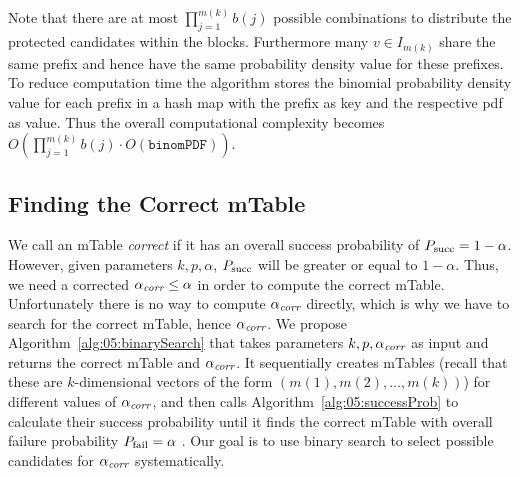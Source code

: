 Note that there are at most $\prod_{j=1}^{m(k)}b(j)$ possible combinations to distribute the protected candidates within the blocks.
%
Furthermore many $v \in I_{m(k)}$ share the same prefix and hence have the same probability density value for these prefixes.
%
To reduce computation time the algorithm stores the binomial probability density value for each prefix in a hash map with the prefix as key and the respective pdf as value.
%
Thus the overall computational complexity becomes $O(\prod_{j=1}^{m(k)}b(j) \cdot O(\texttt{binomPDF}))$.

\subsection{Finding the Correct mTable}\label{subsec:finding-mtable}
We call an mTable \textit{correct} if it has an overall success probability of $P_{\operatorname{succ}} = 1-\alpha$. 
However, given parameters $k,p,\alpha$, $P_{\operatorname{succ}}$ will be greater or equal to $1-\alpha$. Thus, we need a corrected $\alpha_\textit{corr} \leq \alpha$ in order to compute the correct mTable. Unfortunately there is no way to compute $\alpha_\textit{corr}$ directly, which is why we have to search for the correct mTable, hence $\alpha_\textit{corr}$. 
We propose Algorithm~\ref{alg:05:binarySearch} that takes  parameters $k, p, \alpha_\textit{corr}$ as input and returns the correct mTable and $\alpha_\textit{corr}$.
%
%
It sequentially creates mTables (recall that these are $k$-dimensional vectors of the form $(m(1), m(2), \ldots , m(k))$) for different values of $\alpha_\textit{corr}$, and then calls Algorithm~\ref{alg:05:successProb} to calculate their success probability until it finds the correct mTable with overall failure probability $P_{\operatorname{fail}} = \alpha$ . 
%
Our goal is to use binary search to select possible candidates for $\alpha_\textit{corr}$ systematically.

